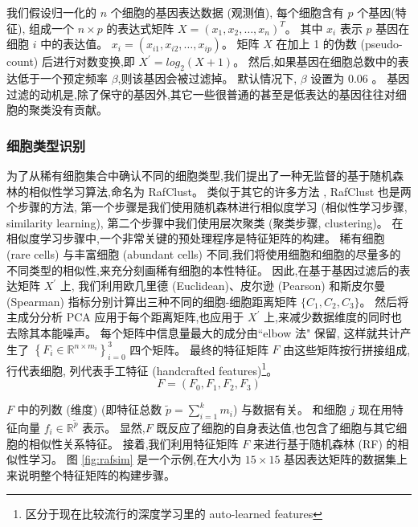我们假设归一化的 $n$ 个细胞的基因表达数据 (观测值), 每个细胞含有 $p$ 个基因(特征),
组成一个 $n \times p$ 的表达式矩阵 $X=\left(x_{1}, x_{2}, \ldots, x_{n} \right)^ T$。
其中 $x_{i}$ 表示 $p$ 基因在细胞 $i$ 中的表达值。
$x_{i}=\left(x_{i1}, x_{i2},\ldots, x_{ip} \right)$。
矩阵 $X$ 在加上 1 的伪数 (pseudo-count) 后进行对数变换,即 $X^{\prime} = log_2 (X + 1)$。
然后,如果基因在细胞总数中的表达低于一个预定频率 $\beta$,则该基因会被过滤掉。
默认情况下, $\beta$ 设置为 0.06 \cite{kiselev2017sc3}。 
基因过滤的动机是,除了保守的基因外,其它一些很普通的甚至是低表达的基因往往对细胞的聚类没有贡献。

\subsubsection{细胞类型识别}
\label{subsec:rafclust} 
为了从稀有细胞集合中确认不同的细胞类型,我们提出了一种无监督的基于随机森林的相似性学习算法,命名为 RafClust。
类似于其它的许多方法 \cite{kiselev2017sc3,pouyan2018random,mohammadi2018geometric,sinha2018dropclust,Srinivasan511626,Li530378,zheng2019sinnlrr},
RafClust 也是两个步骤的方法,
第一个步骤是我们使用随机森林进行相似度学习 (相似性学习步骤, similarity learning),
第二个步骤中我们使用层次聚类 (聚类步骤, clustering)。
在相似度学习步骤中,一个非常关键的预处理程序是特征矩阵的构建。
稀有细胞 (rare cells) 与丰富细胞 (abundant cells) 不同,我们将使用细胞和细胞的尽量多的不同类型的相似性,来充分刻画稀有细胞的本性特征。
因此,在基于基因过滤后的表达矩阵 $X^{\prime}$ 上,
我们利用欧几里德 (Euclidean)、皮尔逊 (Pearson) 和斯皮尔曼 (Spearman) 指标分别计算出三种不同的细胞-细胞距离矩阵 $\{C_1, C_2, C_3\}$。
然后将主成分分析 PCA 应用于每个距离矩阵,也应用于 $X^{\prime}$ 上,来减少数据维度的同时也去除其本能噪声。
每个矩阵中信息量最大的成分由``elbow 法" \cite{thorndike1953belongs} 保留,
这样就共计产生了 $\left\{ {F}_{i} \in \mathbb {R} ^ {n \times m_{i}} \right\}_{i = 0}^{3}$ 四个矩阵。
最终的特征矩阵 $F$ 由这些矩阵按行拼接组成, 行代表细胞, 列代表手工特征 (handcrafted features)\footnote{区分于现在比较流行的深度学习里的 auto-learned features}。
\begin{equation}
\label{lab:f}
{F} = ({F}_{0}, {F}_{1}, {F}_{2}, {F}_{3})
\end{equation}

$F$ 中的列数 (维度) (即特征总数 $\tilde {p} = \sum_{i = 1}^{k} m_{i}$) 与数据有关。
和细胞 $j$ 现在用特征向量 $f_{i} \in \mathbb {R} ^ {\tilde{p}}$ 表示。
显然,$F$ 既反应了细胞的自身表达值,也包含了细胞与其它细胞的相似性关系特征。
接着,我们利用特征矩阵 $F$ 来进行基于随机森林 (RF) 的相似性学习。
图 \ref{fig:rafsim} 是一个示例,在大小为 $15 \times 15$ 基因表达矩阵的数据集上来说明整个特征矩阵的构建步骤。


